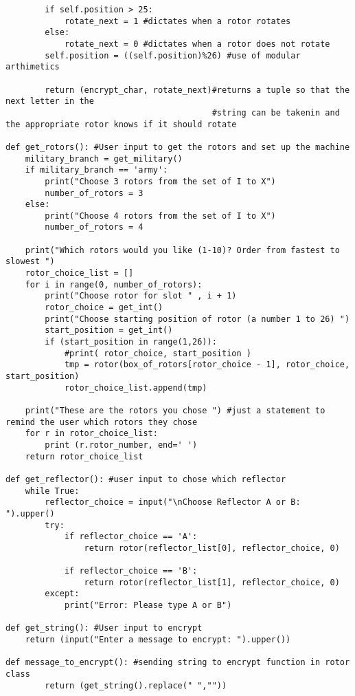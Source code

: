 \documentclass[12pt,letterpaper]{article} %
\begin{document}
\begin{lstlisting}
        if self.position > 25:
            rotate_next = 1 #dictates when a rotor rotates
        else:
            rotate_next = 0 #dictates when a rotor does not rotate
        self.position = ((self.position)%26) #use of modular arthimetics
     
        return (encrypt_char, rotate_next)#returns a tuple so that the next letter in the
                                          #string can be takenin and the appropriate rotor knows if it should rotate
    
def get_rotors(): #User input to get the rotors and set up the machine
    military_branch = get_military()
    if military_branch == 'army':
        print("Choose 3 rotors from the set of I to X")
        number_of_rotors = 3
    else:
        print("Choose 4 rotors from the set of I to X")
        number_of_rotors = 4
        
    print("Which rotors would you like (1-10)? Order from fastest to slowest ")
    rotor_choice_list = []
    for i in range(0, number_of_rotors):
        print("Choose rotor for slot " , i + 1)
        rotor_choice = get_int()    
        print("Choose starting position of rotor (a number 1 to 26) ")
        start_position = get_int()
        if (start_position in range(1,26)):
            #print( rotor_choice, start_position )
            tmp = rotor(box_of_rotors[rotor_choice - 1], rotor_choice, start_position)
            rotor_choice_list.append(tmp) 

    print("These are the rotors you chose ") #just a statement to remind the user which rotors they chose
    for r in rotor_choice_list:
        print (r.rotor_number, end=' ')
    return rotor_choice_list

def get_reflector(): #user input to chose which reflector
    while True:
        reflector_choice = input("\nChoose Reflector A or B: ").upper()
        try:
            if reflector_choice == 'A':
                return rotor(reflector_list[0], reflector_choice, 0)
        
            if reflector_choice == 'B':
                return rotor(reflector_list[1], reflector_choice, 0)
        except:
            print("Error: Please type A or B")

def get_string(): #User input to encrypt
    return (input("Enter a message to encrypt: ").upper())

def message_to_encrypt(): #sending string to encrypt function in rotor class
        return (get_string().replace(" ",""))
       

\end{lstlisting}
\end{document}
